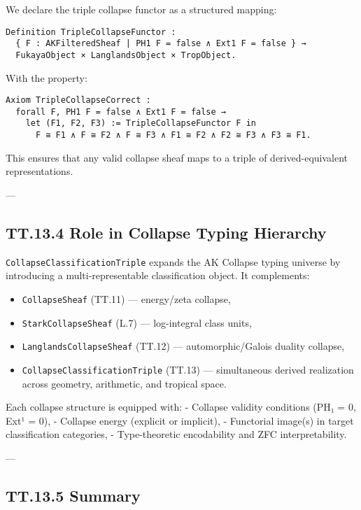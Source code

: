 \documentclass[11pt]{article}
\begin{document}
{We declare the triple collapse functor as a structured mapping:

\begin{verbatim}
Definition TripleCollapseFunctor :
  { F : AKFilteredSheaf | PH1 F = false ∧ Ext1 F = false } →
  FukayaObject × LanglandsObject × TropObject.
\end{verbatim}

With the property:

\begin{verbatim}
Axiom TripleCollapseCorrect :
  forall F, PH1 F = false ∧ Ext1 F = false →
    let (F1, F2, F3) := TripleCollapseFunctor F in
      F ≅ F1 ∧ F ≅ F2 ∧ F ≅ F3 ∧ F1 ≅ F2 ∧ F2 ≅ F3 ∧ F3 ≅ F1.
\end{verbatim}

This ensures that any valid collapse sheaf maps to a triple of derived-equivalent representations.

---

\subsection*{TT.13.4 Role in Collapse Typing Hierarchy}

\texttt{CollapseClassificationTriple} expands the AK Collapse typing universe by introducing  
a multi-representable classification object. It complements:

\begin{itemize}
  \item \texttt{CollapseSheaf} (TT.11) — energy/zeta collapse,
  \item \texttt{StarkCollapseSheaf} (L.7) — log-integral class units,
  \item \texttt{LanglandsCollapseSheaf} (TT.12) — automorphic/Galois duality collapse,
  \item \texttt{CollapseClassificationTriple} (TT.13) — simultaneous derived realization across geometry, arithmetic, and tropical space.
\end{itemize}

Each collapse structure is equipped with:
- Collapse validity conditions (PH₁ = 0, Ext¹ = 0),
- Collapse energy (explicit or implicit),
- Functorial image(s) in target classification categories,
- Type-theoretic encodability and ZFC interpretability.

---

\subsection*{TT.13.5 Summary}

}
\end{document}

